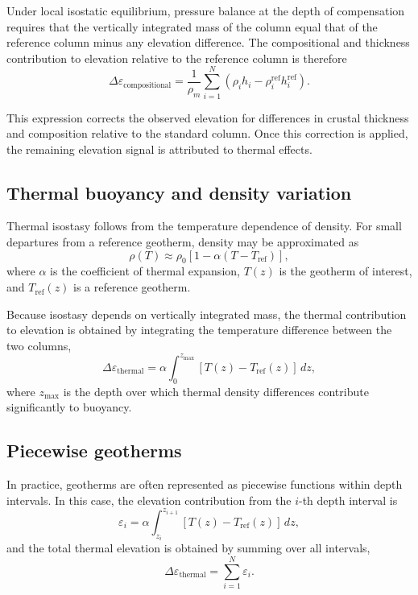 Under local isostatic equilibrium, pressure balance at the depth of compensation requires that the vertically integrated mass of the column equal that of the reference column minus any elevation difference. The compositional and thickness contribution to elevation relative to the reference column is therefore
\begin{equation}
    \Delta \varepsilon_{\mathrm{compositional}}
    =
    \frac{1}{\rho_m}
    \sum_{i=1}^{N}
    \left(
        \rho_i h_i
        -
        \rho_i^{\mathrm{ref}} h_i^{\mathrm{ref}}
    \right).
\end{equation}

This expression corrects the observed elevation for differences in crustal thickness and composition relative to the standard column. Once this correction is applied, the remaining elevation signal is attributed to thermal effects.

\subsection{Thermal buoyancy and density variation}

Thermal isostasy follows from the temperature dependence of density. For small departures from a reference geotherm, density may be approximated as
\[
\rho(T) \approx \rho_0 \left[1 - \alpha \left(T - T_{\mathrm{ref}}\right)\right],
\]
where \(\alpha\) is the coefficient of thermal expansion, \(T(z)\) is the geotherm of interest, and \(T_{\mathrm{ref}}(z)\) is a reference geotherm.

Because isostasy depends on vertically integrated mass, the thermal contribution to elevation is obtained by integrating the temperature difference between the two columns,
\begin{equation}
    \Delta \varepsilon_{\mathrm{thermal}}
    =
    \alpha
    \int_{0}^{z_{\mathrm{max}}}
    \left[ T(z) - T_{\mathrm{ref}}(z) \right] \, dz,
\end{equation}
where \(z_{\mathrm{max}}\) is the depth over which thermal density differences contribute significantly to buoyancy.

\subsection{Piecewise geotherms}

In practice, geotherms are often represented as piecewise functions within depth intervals. In this case, the elevation contribution from the \(i\)-th depth interval is
\begin{equation}
    \varepsilon_i
    =
    \alpha
    \int_{z_i}^{z_{i+1}}
    \left[ T(z) - T_{\mathrm{ref}}(z) \right] \, dz,
\end{equation}
and the total thermal elevation is obtained by summing over all intervals,
\begin{equation}
    \Delta \varepsilon_{\mathrm{thermal}}
    =
    \sum_{i=1}^{N} \varepsilon_i .
\end{equation}

